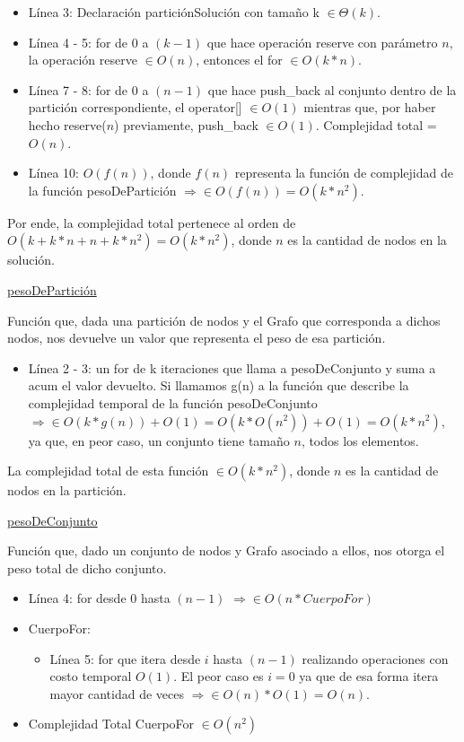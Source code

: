 \documentclass[10pt,a4paper]{article}
\begin{document}
\begin{itemize}
\item Línea 3: Declaración particiónSolución con tamaño k $\in \Theta(k)$.
\item Línea 4 - 5: for de $0$ a $(k-1)$ que hace operación reserve con parámetro $n$, la operación reserve $\in O(n)$, entonces el for $\in O(k*n)$.
\item Línea 7 - 8: for de $0$ a $(n-1)$ que hace push\_back al conjunto dentro de la partición correspondiente, el operator[] $\in O(1)$ mientras que, por haber hecho reserve($n$) previamente, push\_back $\in O(1)$. Complejidad total = $O(n)$.
\item Línea 10: $O(f(n))$, donde $f(n)$ representa la función de complejidad de la función pesoDePartición $\Rightarrow \in O(f(n)) = O(k*n^2)$.
\end{itemize}

Por ende, la complejidad total pertenece al orden de $O(k + k*n + n + k*n^2) = O(k*n^2)$, donde $n$ es la cantidad de nodos en la solución.

\underline{pesoDePartición}

Función que, dada una partición de nodos y el Grafo que corresponda a dichos nodos, nos devuelve un valor que representa el peso de esa partición.

\begin{itemize}
\item Línea 2 - 3: un for de k iteraciones que llama a pesoDeConjunto y suma a acum el valor devuelto. Si llamamos g(n) a la función que describe la complejidad temporal de la función pesoDeConjunto $\Rightarrow \in O(k*g(n)) + O(1) = O(k*O(n^2)) + O(1) = O(k*n^2)$, ya que, en peor caso, un conjunto tiene tamaño $n$, todos los elementos.
\end{itemize}

La complejidad total de esta función $\in O(k*n^2)$, donde $n$ es la cantidad de nodos en la partición.

\underline{pesoDeConjunto}

Función que, dado un conjunto de nodos y Grafo asociado a ellos, nos otorga el peso total de dicho conjunto.

\begin{itemize}
\item Línea 4: for desde $0$ hasta $(n-1)$ $\Rightarrow \in O(n*CuerpoFor)$
\item CuerpoFor:
\begin{itemize}
\item Línea 5: for que itera desde $i$ hasta $(n-1)$ realizando operaciones con costo temporal $O(1)$. El peor caso es $i = 0$ ya que de esa forma itera mayor cantidad de veces $\Rightarrow \in O(n)*O(1) = O(n)$.
\end{itemize}
\item Complejidad Total CuerpoFor $\in O(n^2)$
\end{itemize}
\end{document}
